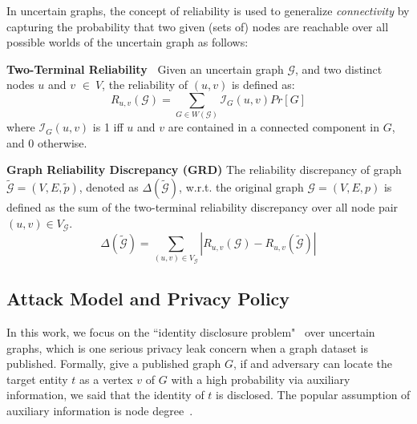 In uncertain graphs, the concept of reliability is used to generalize \emph{connectivity} by  capturing the probability that two given (sets of) nodes are reachable over all possible worlds of the uncertain graph as follows:
\begin{definition}
    \textbf{Two-Terminal Reliability~\cite{Colbourn_Colbourn_1987}}  Given an uncertain graph $\mathcal{G}$, and two distinct nodes $u$ and $v$  $\in~V$, the reliability of $(u,v)$ is defined as:
        \begin{equation*}
                R_{u,v}(\mathcal{G})= \sum_{G \in W(\mathcal{G})}  \mathcal{I}_{G}(u,v) Pr[G] 
        \end{equation*}
    where $\mathcal{I}_{G}(u,v)$ is 1 iff $u$ and $v$ are contained in a connected component in $G$, and 0 otherwise.   
    \label{d:reliability}
\end{definition}


\theoremstyle{definition}
\begin{definition}
    \textbf{Graph Reliability Discrepancy (GRD)}
    The reliability discrepancy of graph $\tilde{\mathcal{G}}=(V,E, \tilde{\mathit{p}})$, 
    denoted as $\Delta(\tilde{\mathcal{G}})$, 
    w.r.t. the original graph  $\mathcal{G}=(V,E,\mathit{p})$  is 
    defined as the sum of the two-terminal reliability discrepancy over all node pair $(u,v) \in V_\mathcal{G}$.
    \begin{equation*}
        \Delta(\tilde{\mathcal{G}})=\sum_{(u,v) \in V_\mathcal{G} }|R_{u,v}(\mathcal{G})-R_{u,v}(\tilde{\mathcal{G}})|
    \end{equation*}
\end{definition}


\subsection{Attack Model and Privacy Policy}
\label{sec:AMPC}
In this work, we focus on the ``identity disclosure problem"~\cite{Liu_Towards_2008} over uncertain graphs, which is one serious privacy leak concern when a graph dataset is published. Formally, give a published graph $G$, if and adversary can locate the target entity $t$ as a vertex $v$ of $G$ with a high probability via auxiliary information, we said that the identity of $t$ is disclosed. The popular assumption of auxiliary information is node degree~\cite{Liu_Towards_2008}. 

